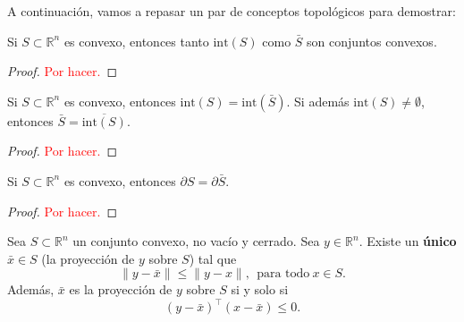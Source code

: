 A continuación, vamos a repasar un par de conceptos topológicos para demostrar:

\begin{corol}
Si $S\subset\mathbb{R}^n$ es convexo, entonces tanto $\mbox{int}(S)$ como $\bar{S}$ son conjuntos convexos.
\end{corol}
\begin{proof}
\textcolor{red}{Por hacer.}
\end{proof}
\begin{corol}
Si $S\subset\mathbb{R}^n$ es convexo, entonces $\mbox{int}(S)=\mbox{int}(\bar{S})$. 
Si además $\mbox{int}(S)\neq \emptyset$, entonces $\bar{S}=\overline{\mbox{int}(S)}$.
\end{corol}
\begin{proof}
\textcolor{red}{Por hacer.}
\end{proof}

\begin{corol}
Si $S\subset\mathbb{R}^n$ es convexo, entonces $\partial S=\partial \bar{S}$.
\end{corol}
\begin{proof}
\textcolor{red}{Por hacer.}
\end{proof}


\begin{theorem}
 Sea $S\subset\mathbb{R}^n$ un conjunto convexo, no vacío y cerrado. Sea $y\in \mathbb{R}^n$. Existe un \textbf{único} $\bar x\in S$ (la proyección de $y$ sobre $S$) tal que 
\[
\|y-\bar x\| \leq \|y - x\|, \ \ \mbox{para todo}\ x\in S.
\]
Además, $\bar x$ es la proyección de $y$ sobre $S$ si y solo si
\begin{equation}
\label{eq.proyeccion}
(y-\bar x)^\top (x - \bar{x}) \leq 0.
\end{equation}
\end{theorem}

